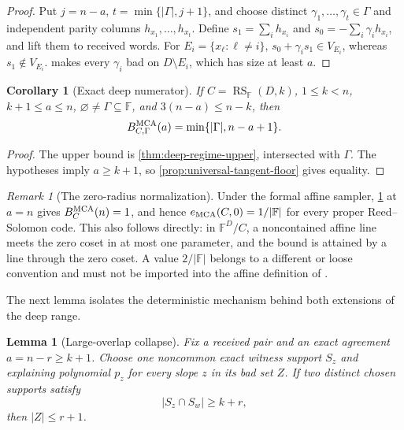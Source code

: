 \documentclass[11pt,a4paper]{amsart}
\numberwithin{equation}{section}
\newtheorem{lemma}[lemma]{Lemma}
\newtheorem{corollary}[corollary]{Corollary}
\theoremstyle{remark}
\newtheorem{remark}[remark]{Remark}
\DeclareMathOperator{\RS}{RS}
\newcommand{\F}{\mathbb F}
\newcommand{\abs}[1]{\lvert #1\rvert}
\begin{document}
\begin{proof}
Put \(j=n-a\), \(t=\min\{\abs\Gamma,j+1\}\), and choose distinct
\(\gamma_1,\ldots,\gamma_t\in\Gamma\) and independent parity columns
\(h_{x_1},\ldots,h_{x_t}\).  Define
\(s_1=\sum_i h_{x_i}\) and \(s_0=-\sum_i\gamma_i h_{x_i}\), and lift them
to received words.  For \(E_i=\{x_\ell:\ell\ne i\}\),
\(s_0+\gamma_i s_1\in V_{E_i}\), whereas \(s_1\notin V_{E_i}\).
 makes every \(\gamma_i\) bad on
\(D\setminus E_i\), which has size at least \(a\).
\end{proof}

\begin{corollary}[Exact deep numerator]\label{cor:exact-deep-numerator}
If \(C=\RS_\F(D,k)\), \(1\le k<n\), \(k+1\le a\le n\),
\(\varnothing\ne\Gamma\subseteq\F\), and \(3(n-a)\le n-k\), then
\[
 B_{C,\Gamma}^{\rm MCA}(a)
 =\min\{\abs\Gamma,n-a+1\}.
\]
\end{corollary}

\begin{proof}
The upper bound is \cref{thm:deep-regime-upper}, intersected with
\(\Gamma\).  The hypotheses imply \(a\ge k+1\), so
\cref{prop:universal-tangent-floor} gives equality.
\end{proof}

\begin{remark}[The zero-radius normalization]
Under the formal affine sampler, \cref{cor:exact-deep-numerator} at
\(a=n\) gives \(B_C^{\rm MCA}(n)=1\), and hence
\(e_{\rm MCA}(C,0)=1/\abs\F\) for every proper Reed--Solomon code.  This
also follows directly: in \(\F^D/C\), a noncontained affine line meets
the zero coset in at most one parameter, and the bound is attained by a
line through the zero coset.  A value \(2/\abs\F\) belongs to a different
or loose convention and must not be imported into the affine definition
of \cite{ABF26}.
\end{remark}

The next lemma isolates the deterministic mechanism behind both extensions
of the deep range.

\begin{lemma}[Large-overlap collapse]
\label{lem:large-overlap-collapse}
Fix a received pair and an exact agreement \(a=n-r\ge k+1\).  Choose one
noncommon exact witness support \(S_z\) and explaining polynomial \(p_z\)
for every slope \(z\) in its bad set \(Z\).  If two distinct chosen
supports satisfy
\[
                    \abs{S_z\cap S_w}\ge k+r,       \tag{MO1}
\label{eq:large-overlap-collapse}
\]
then \(\abs Z\le r+1\).
\end{lemma}
\end{document}
